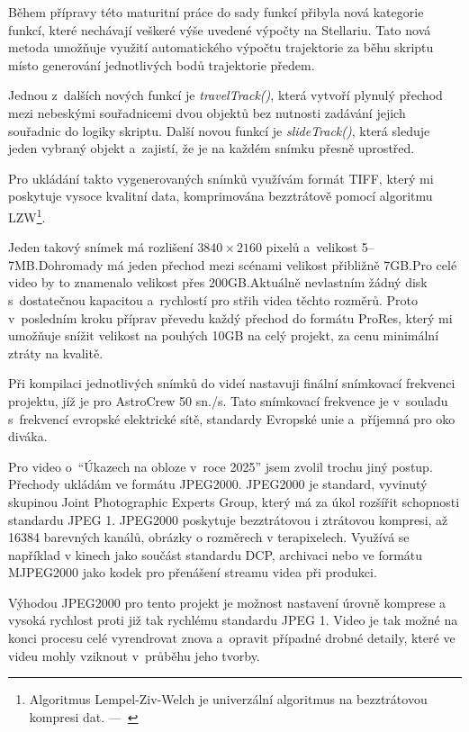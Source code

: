 \documentclass[12pt,a4paper,titlepage]{article}
\begin{document}
Během přípravy této maturitní práce do sady funkcí přibyla nová kategorie funkcí, které nechávají veškeré výše uvedené výpočty na Stellariu. Tato nová metoda umožňuje využití automatického výpočtu trajektorie za běhu skriptu místo generování jednotlivých bodů trajektorie předem. 

Jednou z~dalších nových funkcí je \textit{travelTrack()}, která vytvoří plynulý přechod mezi nebeskými souřadnicemi dvou objektů bez nutnosti zadávání jejich souřadnic do logiky skriptu. Další novou funkcí je \textit{slideTrack()}, která sleduje jeden vybraný objekt a~zajistí, že je na každém snímku přesně uprostřed. %

Pro ukládání takto vygenerovaných snímků využívám formát TIFF, který mi poskytuje vysoce kvalitní data, komprimována bezztrátově pomocí algoritmu LZW\footnote{Algoritmus Lempel-Ziv-Welch je univerzální algoritmus na bezztrátovou kompresi dat.  ---~\cite{wiki:lzw}}.

Jeden takový snímek má rozlišení \(3840\times2160\) pixelů a~velikost 5--7MB.\@ Dohromady má jeden přechod mezi scénami velikost přibližně 7GB.\@ Pro celé video by to znamenalo velikost přes 200GB.\@ Aktuálně nevlastním žádný disk s~dostatečnou kapacitou a~rychlostí pro střih videa těchto rozměrů. Proto v~posledním kroku příprav převedu každý přechod do formátu ProRes, který mi umožňuje snížit velikost na pouhých 10GB na celý projekt, za cenu minimální ztráty na kvalitě. 

Při kompilaci jednotlivých snímků do videí nastavuji finální snímkovací frekvenci projektu, jíž je pro AstroCrew 50 sn./s. Tato snímkovací frekvence je v~souladu s~frekvencí evropské elektrické sítě, standardy Evropské unie a~příjemná pro oko diváka.

Pro video o~\enquote{Úkazech na obloze v~roce 2025} jsem zvolil trochu jiný postup. Přechody ukládám ve formátu JPEG2000. JPEG2000 je standard, vyvinutý skupinou Joint Photographic Experts Group, který má za úkol rozšířit schopnosti standardu JPEG 1. JPEG2000 poskytuje bezztrátovou i ztrátovou kompresi, až 16384 barevných kanálů, obrázky o rozměrech v terapixelech. Využívá se například v kinech jako součást standardu DCP, archivaci nebo ve formátu MJPEG2000 jako kodek pro přenášení streamu videa při produkci. 

Výhodou JPEG2000 pro tento projekt je možnost nastavení úrovně komprese a vysoká rychlost proti již tak rychlému standardu JPEG 1. Video je tak možné na konci procesu celé vyrendrovat znova a~opravit případné drobné detaily, které ve videu mohly vziknout v~průběhu jeho tvorby.
\end{document}
